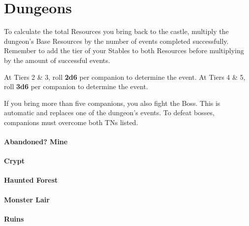 \chapter{Dungeons}

To calculate the total Resources you bring back to the castle, multiply the dungeon’s Base Resources by the number of events completed successfully. Remember to add the tier of your Stables to both Resources before multiplying by the amount of successful events.

\skipline

At Tiers 2 \& 3, roll \textbf{2d6} per companion to determine the event. At Tiers 4 \& 5, roll \textbf{3d6} per companion to determine the event.

\skipline

If you bring more than five companions, you also fight the Boss. This is automatic and replaces one of the dungeon’s events. To defeat bosses, companions must overcome both TNs listed.

\skipline


\begin{tabbox}[4][4]
	\subsubsection{Abandoned? Mine}
	
	\subsubsection{Crypt}
	
	\subsubsection{Haunted Forest}
	
	\subsubsection{Monster Lair}
	
	\subsubsection{Ruins}

\end{tabbox}

